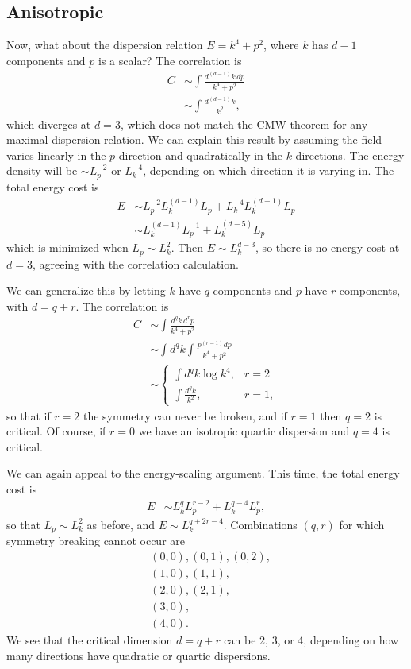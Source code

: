 \documentclass[12pt]{article}
\newcommand{\nn}{\nonumber\\}
\begin{document}
\subsection{Anisotropic}

Now, what about the dispersion relation $E = k^4 + p^2$, where $k$ has $d-1$ components and $p$ is a scalar? The correlation is
\begin{align}
C &\sim \int \frac{d^{(d-1)}k \, dp}{k^4 + p^2} \nn
&\sim \int \frac{d^{(d-1)}k}{k^2},
\end{align}
which diverges at $d=3$, which does not match the CMW theorem for any maximal dispersion relation. We can explain this result by assuming the field varies linearly in the $p$ direction and quadratically in the $k$ directions. The energy density will be $\sim L_p^{-2}$ or $L_k^{-4}$, depending on which direction it is varying in. The total energy cost is
\begin{align}
E &\sim L_p^{-2} L_k^{(d-1)} L_p + L_k^{-4} L_k^{(d-1)} L_p\nn
&\sim L_k^{(d-1)} L_p^{-1} + L_k^{(d-5)} L_p
\end{align}
which is minimized when $L_p \sim L_k^2$. Then $E\sim L_k^{d-3}$, so there is no energy cost at $d=3$, agreeing with the correlation calculation.


We can generalize this by letting $k$ have $q$ components and $p$ have $r$ components, with $d=q+r$. The correlation is
\begin{align}
C &\sim \int \frac{d^qk \, d^r\!p}{k^4 + p^2}\nn
&\sim \int d^qk \int \frac{p^{(r-1)}dp}{k^4+p^2} \nn
&\sim \begin{cases} \int d^qk \log k^4, &r=2\\
    \int \frac{d^qk}{k^2}, & r=1,
\end{cases}
\end{align}
so that if $r=2$ the symmetry can never be broken, and if $r=1$ then $q=2$ is critical. Of course, if $r=0$ we have an isotropic quartic dispersion and $q=4$ is critical. 

We can again appeal to the energy-scaling argument. This time, the total energy cost is
\begin{align}
E &\sim L_k^{q} L_p^{r-2} + L_k^{q-4} L_p^r,
\end{align}
so that $L_p \sim L_k^2$ as before, and $E\sim L_k^{q+2r-4}$. Combinations $(q,r)$ for which symmetry breaking cannot occur are
\begin{align}
&(0,0), (0,1), (0,2), \nn
&(1,0), (1,1), \nn
&(2,0), (2,1), \nn
&(3,0), \nn
&(4,0).
\end{align}
We see that the critical dimension $d=q+r$ can be 2, 3, or 4, depending on how many directions have quadratic or quartic dispersions.
\end{document}

